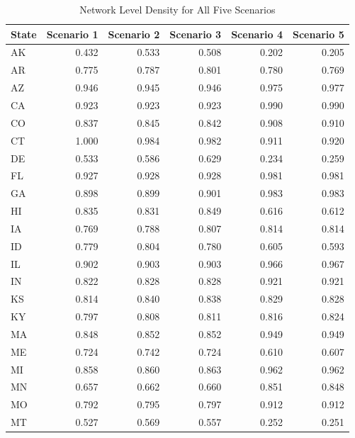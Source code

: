 \documentclass[]{article}
\begin{document}
\begin{table}[!h]

\caption{\label{tab:unnamed-chunk-45}Network Level Density for All Five Scenarios}
\centering
\begin{tabular}{l|r|r|r|r|r}
\hline
State & Scenario 1 & Scenario 2 & Scenario 3 & Scenario 4 & Scenario 5\\
\hline
\rowcolor{gray!6}  AK & 0.432 & 0.533 & 0.508 & 0.202 & 0.205\\
\hline
AR & 0.775 & 0.787 & 0.801 & 0.780 & 0.769\\
\hline
\rowcolor{gray!6}  AZ & 0.946 & 0.945 & 0.946 & 0.975 & 0.977\\
\hline
CA & 0.923 & 0.923 & 0.923 & 0.990 & 0.990\\
\hline
\rowcolor{gray!6}  CO & 0.837 & 0.845 & 0.842 & 0.908 & 0.910\\
\hline
CT & 1.000 & 0.984 & 0.982 & 0.911 & 0.920\\
\hline
\rowcolor{gray!6}  DE & 0.533 & 0.586 & 0.629 & 0.234 & 0.259\\
\hline
FL & 0.927 & 0.928 & 0.928 & 0.981 & 0.981\\
\hline
\rowcolor{gray!6}  GA & 0.898 & 0.899 & 0.901 & 0.983 & 0.983\\
\hline
HI & 0.835 & 0.831 & 0.849 & 0.616 & 0.612\\
\hline
\rowcolor{gray!6}  IA & 0.769 & 0.788 & 0.807 & 0.814 & 0.814\\
\hline
ID & 0.779 & 0.804 & 0.780 & 0.605 & 0.593\\
\hline
\rowcolor{gray!6}  IL & 0.902 & 0.903 & 0.903 & 0.966 & 0.967\\
\hline
IN & 0.822 & 0.828 & 0.828 & 0.921 & 0.921\\
\hline
\rowcolor{gray!6}  KS & 0.814 & 0.840 & 0.838 & 0.829 & 0.828\\
\hline
KY & 0.797 & 0.808 & 0.811 & 0.816 & 0.824\\
\hline
\rowcolor{gray!6}  MA & 0.848 & 0.852 & 0.852 & 0.949 & 0.949\\
\hline
ME & 0.724 & 0.742 & 0.724 & 0.610 & 0.607\\
\hline
\rowcolor{gray!6}  MI & 0.858 & 0.860 & 0.863 & 0.962 & 0.962\\
\hline
MN & 0.657 & 0.662 & 0.660 & 0.851 & 0.848\\
\hline
\rowcolor{gray!6}  MO & 0.792 & 0.795 & 0.797 & 0.912 & 0.912\\
\hline
MT & 0.527 & 0.569 & 0.557 & 0.252 & 0.251\\

\end{tabular}
\end{table}
\end{document}

